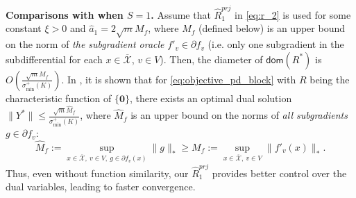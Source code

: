 \documentclass[10pt]{article}
\newcommand{\mc}{\mathcal}
\newcommand{\mb}{\mathbf}
\newcommand{\domain}{\mathsf{dom}}
\begin{document}
\textbf{Comparisons with \cite{lan_communication-efficient_2020} when $S=1$.} Assume that $\widehat{R}^{prj}_1$ in \eqref{eq:r_2} is used for some constant $\xi>0$ and $\widehat{a}_1 = 2\sqrt{m}M_f$, where $M_f$ (defined below) is an upper bound on the norm of \textit{the subgradient oracle} $f'_v\in \partial f_v$ (i.e. only one subgradient in the subdifferential for each $x\in \overline{\mc X}$, $v\in V$). Then, the diameter of $\domain(R^*)$ is $O(\frac{\sqrt{m}M_f}{\sigma^+_{\min}(K)})$. In \cite{lan_communication-efficient_2020}, it is shown that for \eqref{eq:objective_pd_block} with $R$ being the characteristic function of $\{\mb 0\}$, there exists an optimal dual solution $\|Y^*\|\leq \frac{\sqrt{m}\widehat{M}_f}{\sigma^+_{\min}(K)}$, where $\widehat{M}_f$ is an upper bound on the norms of \textit{all subgradients} $g\in \partial f_v$:
\begin{displaymath}
    \widehat{M}_f := \sup_{x\in \overline{\mc X},~v\in V,~g\in \partial f_v(x)} \|g\|_* \geq  M_f:=\sup_{x\in \overline{\mc X},~v\in V} \|f'_v(x)\|_*.
\end{displaymath}
Thus, even without function similarity, our $\widehat{R}^{prj}_1$ provides better control over the dual variables, leading to faster convergence. 
\end{document}
